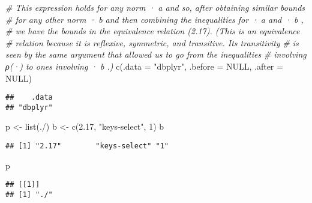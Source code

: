 \documentclass[
]{article}
\newenvironment{Shaded}{\begin{snugshade}}{\end{snugshade}}
\newcommand{\AttributeTok}[1]{\textcolor[rgb]{0.77,0.63,0.00}{#1}}
\newcommand{\CommentTok}[1]{\textcolor[rgb]{0.56,0.35,0.01}{\textit{#1}}}
\newcommand{\ConstantTok}[1]{\textcolor[rgb]{0.00,0.00,0.00}{#1}}
\newcommand{\DecValTok}[1]{\textcolor[rgb]{0.00,0.00,0.81}{#1}}
\newcommand{\FloatTok}[1]{\textcolor[rgb]{0.00,0.00,0.81}{#1}}
\newcommand{\FunctionTok}[1]{\textcolor[rgb]{0.00,0.00,0.00}{#1}}
\newcommand{\NormalTok}[1]{#1}
\newcommand{\OtherTok}[1]{\textcolor[rgb]{0.56,0.35,0.01}{#1}}
\newcommand{\StringTok}[1]{\textcolor[rgb]{0.31,0.60,0.02}{#1}}
\begin{document}
\begin{Shaded}
\begin{Highlighting}[]
\CommentTok{\# This expression holds for any norm · a and so, after obtaining similar bounds}
\CommentTok{\# for any other norm · b and then combining the inequalities for · a and · b ,}
\CommentTok{\# we have the bounds in the equivalence relation (2.17). (This is an equivalence}
\CommentTok{\# relation because it is reflexive, symmetric, and transitive. Its transitivity }
\CommentTok{\# is seen by the same argument that allowed us to go from the inequalities }
\CommentTok{\# involving ρ(·) to ones involving  ·  b .)}
\FunctionTok{c}\NormalTok{(}\AttributeTok{.data =} \StringTok{"dbplyr"}\NormalTok{, }\AttributeTok{.before =} \ConstantTok{NULL}\NormalTok{, }\AttributeTok{.after =} \ConstantTok{NULL}\NormalTok{)}
\end{Highlighting}
\end{Shaded}

\begin{verbatim}
##    .data 
## "dbplyr"
\end{verbatim}

\begin{Shaded}
\begin{Highlighting}[]
\NormalTok{p }\OtherTok{\textless{}{-}} \FunctionTok{list}\NormalTok{(}\StringTok{\textquotesingle{}./\textquotesingle{}}\NormalTok{)}
\NormalTok{b }\OtherTok{\textless{}{-}} \FunctionTok{c}\NormalTok{(}\FloatTok{2.17}\NormalTok{, }\StringTok{"keys{-}select"}\NormalTok{, }\DecValTok{1}\NormalTok{)}
\NormalTok{b}
\end{Highlighting}
\end{Shaded}

\begin{verbatim}
## [1] "2.17"        "keys-select" "1"
\end{verbatim}

\begin{Shaded}
\begin{Highlighting}[]
\NormalTok{p}
\end{Highlighting}
\end{Shaded}

\begin{verbatim}
## [[1]]
## [1] "./"
\end{verbatim}
\end{document}

